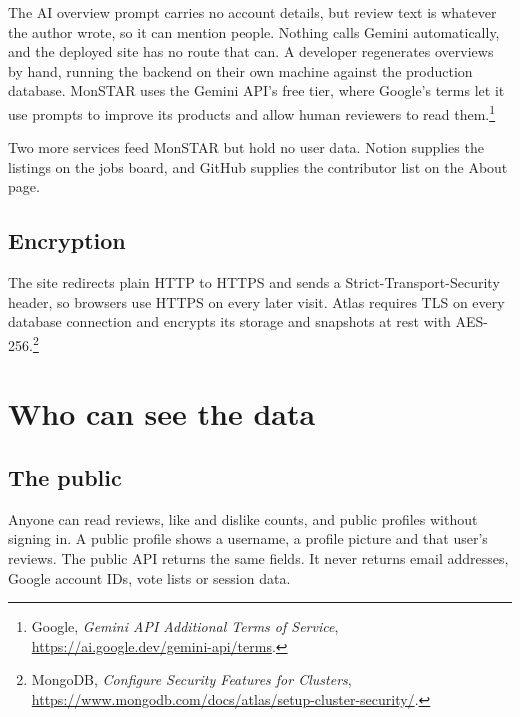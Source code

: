 \documentclass[11pt,a4paper]{article}
\begin{document}
The AI overview prompt carries no account details, but review text is
whatever the author wrote, so it can mention people.  Nothing calls Gemini
automatically, and the deployed site has no route that can.  A developer
regenerates overviews by hand, running the backend on their own machine
against the production database.  MonSTAR uses the Gemini API's free tier,
where Google's terms let it use prompts to improve its products and allow
human reviewers to read them.\footnote{Google, \emph{Gemini API Additional
Terms of Service}, \url{https://ai.google.dev/gemini-api/terms}.}

Two more services feed MonSTAR but hold no user data.  Notion supplies the
listings on the jobs board, and GitHub supplies the contributor list on the
About page.

\subsection{Encryption}

The site redirects plain HTTP to HTTPS and sends a Strict-Transport-Security
header, so browsers use HTTPS on every later visit.  Atlas requires TLS on
every database connection and encrypts its storage and snapshots at rest with
AES-256.\footnote{\raggedright MongoDB, \emph{Configure Security Features for Clusters},
\url{https://www.mongodb.com/docs/atlas/setup-cluster-security/}.}

\section{Who can see the data}
\label{sec:access}

\subsection{The public}

Anyone can read reviews, like and dislike counts, and public profiles without
signing in.  A public profile shows a username, a profile picture and that
user's reviews.  The public API returns the same fields.  It never returns
email addresses, Google account IDs, vote lists or session data.
\end{document}
